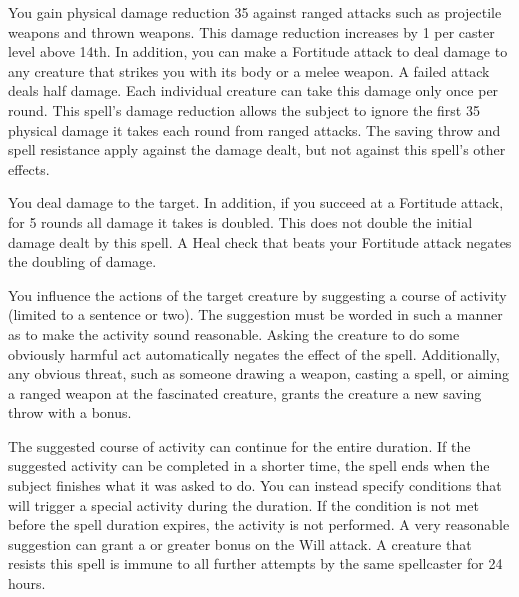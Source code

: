 \spelldur{\durshort \dismissable}
\spelleffect You gain physical damage reduction 35 against ranged attacks such as projectile weapons and thrown weapons. This damage reduction increases by 1 per caster level above 14th. In addition, you can make a Fortitude attack to deal damage to any creature that strikes you with its body or a melee weapon. A failed attack deals half damage. Each individual creature can take this damage only once per round.
\spellnotes This spell's damage reduction allows the subject to ignore the first 35 physical damage it takes each round from ranged attacks. The saving throw and spell resistance apply against the damage dealt, but not against this spell's other effects.

\spelleffect You deal damage to the target. In addition, if you succeed at a Fortitude attack, for 5 rounds all damage it takes is doubled. This does not double the initial damage dealt by this spell.
\spellnotes A Heal check that beats your Fortitude attack negates the doubling of damage. 

\spelleffect You influence the actions of the target creature by suggesting a course of activity (limited to a sentence or two). The suggestion must be worded in such a manner as to make the activity sound reasonable. Asking the creature to do some obviously harmful act automatically negates the effect of the spell. Additionally, any obvious threat, such as someone drawing a weapon, casting a spell, or aiming a ranged weapon at the fascinated creature, grants the creature a new saving throw with a  bonus.
\par The suggested course of activity can continue for the entire duration. If the suggested activity can be completed in a shorter time, the spell ends when the subject finishes what it was asked to do. You can instead specify conditions that will trigger a special activity during the duration. If the condition is not met before the spell duration expires, the activity is not performed.
\spellnotes A very reasonable suggestion can grant a  or greater bonus on the Will attack. A creature that resists this spell is immune to all further attempts by the same spellcaster for 24 hours.


